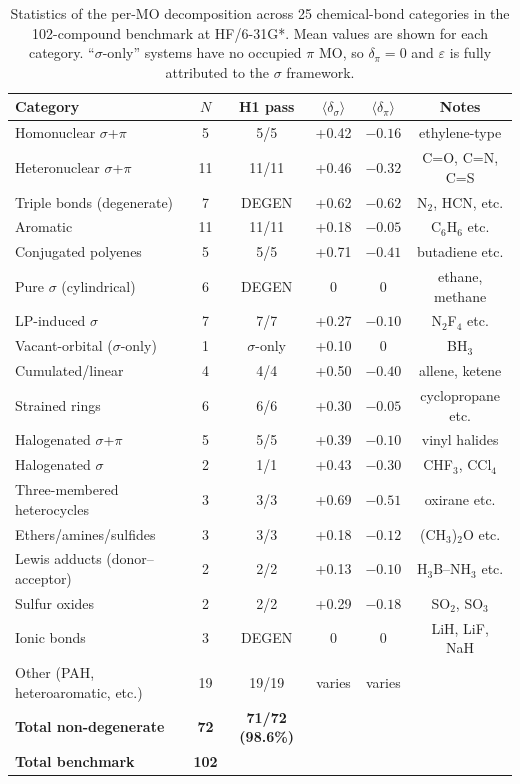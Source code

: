 \documentclass[11pt,a4paper]{article}
\newcommand{\delsg}{\delta_{\sigma}}
\newcommand{\delpi}{\delta_{\pi}}
\newcommand{\eps}{\varepsilon}
\begin{document}
\begin{table}[t]
\centering
\caption{Statistics of the per-MO decomposition across 25 chemical-bond
categories in the 102-compound benchmark at HF/6-31G*. Mean values are
shown for each category. ``$\sigma$-only'' systems have no occupied
$\pi$ MO, so $\delpi = 0$ and $\eps$ is fully attributed to the
$\sigma$ framework.}
\label{tab:categories}
\begin{tabular}{lccccc}
\toprule
Category & $N$ & H1 pass & $\langle \delsg \rangle$ & $\langle \delpi \rangle$ & Notes \\
\midrule
Homonuclear $\sigma$+$\pi$  & 5 & 5/5 & +0.42 & $-0.16$ & ethylene-type \\
Heteronuclear $\sigma$+$\pi$ & 11 & 11/11 & +0.46 & $-0.32$ & C=O, C=N, C=S \\
Triple bonds (degenerate)   & 7 & DEGEN & +0.62 & $-0.62$ & N$_2$, HCN, etc. \\
Aromatic                    & 11 & 11/11 & +0.18 & $-0.05$ & C$_6$H$_6$ etc. \\
Conjugated polyenes         & 5 & 5/5 & +0.71 & $-0.41$ & butadiene etc. \\
Pure $\sigma$ (cylindrical) & 6 & DEGEN & 0 & 0 & ethane, methane \\
LP-induced $\sigma$         & 7 & 7/7 & +0.27 & $-0.10$ & N$_2$F$_4$ etc. \\
Vacant-orbital ($\sigma$-only) & 1 & $\sigma$-only & +0.10 & 0 & BH$_3$ \\
Cumulated/linear            & 4 & 4/4 & +0.50 & $-0.40$ & allene, ketene \\
Strained rings              & 6 & 6/6 & +0.30 & $-0.05$ & cyclopropane etc. \\
Halogenated $\sigma$+$\pi$  & 5 & 5/5 & +0.39 & $-0.10$ & vinyl halides \\
Halogenated $\sigma$        & 2 & 1/1 & +0.43 & $-0.30$ & CHF$_3$, CCl$_4$ \\
Three-membered heterocycles & 3 & 3/3 & +0.69 & $-0.51$ & oxirane etc. \\
Ethers/amines/sulfides      & 3 & 3/3 & +0.18 & $-0.12$ & (CH$_3$)$_2$O etc. \\
Lewis adducts (donor--acceptor) & 2 & 2/2 & +0.13 & $-0.10$ & H$_3$B--NH$_3$ etc. \\
Sulfur oxides               & 2 & 2/2 & +0.29 & $-0.18$ & SO$_2$, SO$_3$ \\
Ionic bonds                 & 3 & DEGEN & 0 & 0 & LiH, LiF, NaH \\
Other (PAH, heteroaromatic, etc.) & 19 & 19/19 & varies & varies & \\
\midrule
\textbf{Total non-degenerate} & \textbf{72} & \textbf{71/72 (98.6\%)} & & & \\
\textbf{Total benchmark} & \textbf{102} & & & & \\
\bottomrule
\end{tabular}
\end{table}
\end{document}
